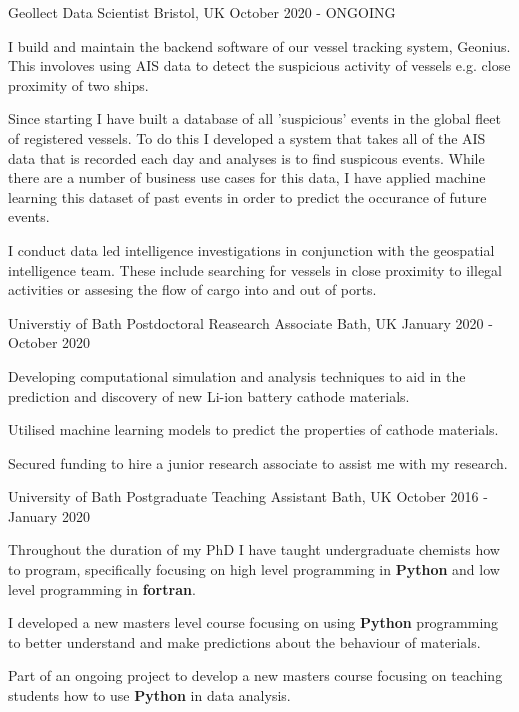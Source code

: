 \begin{cventries}
  \cventry
    {Geollect}
    {Data Scientist}
    {Bristol, UK}
    {October 2020 - ONGOING}
    {
      \begin{cvitems}
        \item {I build and maintain the backend software of our vessel tracking system, Geonius. This involoves using AIS data to detect the suspicious activity of vessels e.g. close proximity of two ships.}
        \item {Since starting I have built a database of all 'suspicious' events in the global fleet of registered vessels. To do this I developed a system that takes all of the AIS data that is recorded each day and analyses is to find suspicous events. While there are a number of business use cases for this data, I have applied machine learning this dataset of past events in order to predict the occurance of future events.}
        \item {I conduct data led intelligence investigations in conjunction with the geospatial intelligence team. These include searching for vessels in close proximity to illegal activities or assesing the flow of cargo into and out of ports.}
      \end{cvitems}
    }
  \cventry
    {Universtiy of Bath}
    {Postdoctoral Reasearch Associate}
    {Bath, UK}
    {January 2020 - October 2020}
    {
      \begin{cvitems}
        \item {Developing computational simulation and analysis techniques to aid in the prediction and discovery of new Li-ion battery cathode materials.}
        \item {Utilised machine learning models to predict the properties of cathode materials.}
        \item {Secured funding to hire a junior research associate to assist me with my research.}
      \end{cvitems}
    }
    \cventry
    {University of Bath}    
    {Postgraduate Teaching Assistant}
    {Bath, UK}
    {October 2016 - January 2020}
    {
      \begin{cvitems}
        \item{Throughout the duration of my PhD I have taught undergraduate chemists how to program, specifically focusing on high level programming in \textbf{Python} and low level programming in \textbf{fortran}.}
        \item{I developed a new masters level course focusing on using \textbf{Python} programming to better understand and make predictions about the behaviour of materials.}
        \item{Part of an ongoing project to develop a new masters course focusing on teaching students how to use \textbf{Python} in data analysis.}
      \end{cvitems}
    }


\end{cventries}
